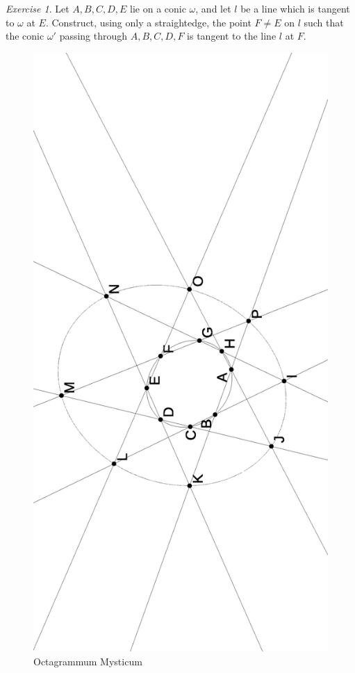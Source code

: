 \documentclass[letterpaper,11pt]{article}
\theoremstyle{definition}
\theoremstyle{remark}
\newtheorem{exer}{Exercise}
\begin{document}
\begin{exer} Let $A,B,C,D,E$ lie on a conic $\omega$, and let $l$ be a line which is tangent to $\omega$ at $E$. Construct, using only a straightedge, the point $F \ne E$ on $l$ such that the conic $\omega'$ passing through $A,B,C,D,F$ is tangent to the line $l$ at $F$.
\end{exer}

\begin{figure}[!htb]
\centering
\includegraphics[scale=0.5,angle=270]{octa.eps}
\caption{Octagrammum Mysticum}\label{octa}
\end{figure}
\end{document}
